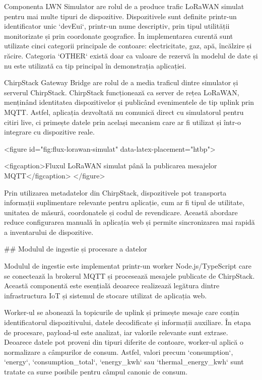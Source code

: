 Componenta LWN Simulator are rolul de a produce trafic LoRaWAN simulat
pentru mai multe tipuri de dispozitive. Dispozitivele sunt definite
printr-un identificator unic `devEui`, printr-un nume descriptiv, prin
tipul utilității monitorizate și prin coordonate geografice. În
implementarea curentă sunt utilizate cinci categorii principale de
contoare: electricitate, gaz, apă, încălzire și răcire. Categoria
`OTHER` există doar ca valoare de rezervă în modelul de date și nu este
utilizată ca tip principal în demonstrația aplicației.

ChirpStack Gateway Bridge are rolul de a media traficul dintre simulator
și serverul ChirpStack. ChirpStack funcționează ca server de rețea
LoRaWAN, menținând identitatea dispozitivelor și publicând evenimentele
de tip uplink prin MQTT. Astfel, aplicația dezvoltată nu comunică direct
cu simulatorul pentru citiri live, ci primește datele prin același
mecanism care ar fi utilizat și într-o integrare cu dispozitive reale.

<figure id="fig:flux-lorawan-simulat" data-latex-placement="htbp">

<figcaption>Fluxul LoRaWAN simulat până la publicarea mesajelor
MQTT</figcaption>
</figure>

Prin utilizarea metadatelor din ChirpStack, dispozitivele pot transporta
informații suplimentare relevante pentru aplicație, cum ar fi tipul de
utilitate, unitatea de măsură, coordonatele și codul de revendicare.
Această abordare reduce configurarea manuală în aplicația web și permite
sincronizarea mai rapidă a inventarului de dispozitive.

## Modulul de ingestie și procesare a datelor

Modulul de ingestie este implementat printr-un worker Node.js/TypeScript
care se conectează la brokerul MQTT și procesează mesajele publicate de
ChirpStack. Această componentă este esențială deoarece realizează
legătura dintre infrastructura IoT și sistemul de stocare utilizat de
aplicația web.

Worker-ul se abonează la topicurile de uplink și primește mesaje care
conțin identificatorul dispozitivului, datele decodificate și informații
auxiliare. În etapa de procesare, payload-ul este analizat, iar valorile
relevante sunt extrase. Deoarece datele pot proveni din tipuri diferite
de contoare, worker-ul aplică o normalizare a câmpurilor de consum.
Astfel, valori precum `consumption`, `energy`, `consumption_total`,
`energy_kwh` sau `thermal_energy_kwh` sunt tratate ca surse posibile
pentru câmpul canonic de consum.

